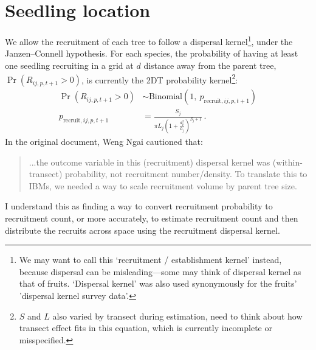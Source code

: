 \documentclass[12pt,a4paper]{article}
\begin{document}
\section{Seedling location}
We allow the recruitment of each tree to follow a dispersal kernel\footnote{We may want to call this `recruitment / establishment kernel' instead, because dispersal can be misleading---some may think of dispersal kernel as that of fruits. `Dispersal kernel' was also used synonymously for the fruits' 'dispersal kernel survey data'.}, under the Janzen--Connell hypothesis. For each species, the probability of having at least one seedling recruiting in a grid at $d$ distance away from the parent tree, $\Pr(R_{ij,p,t+1} > 0)$, is currently the 2DT probability kernel\footnote{$S$ and $L$ also varied by transect during estimation, need to think about how transect effect fits in this equation, which is currently incomplete or misspecified.}:
\begin{align}
\Pr(R_{ij,p,t+1} > 0) &\sim \text{Binomial}(1,~p_{\text{recruit},ij,p,t+1}) \\
p_{\text{recruit},ij,p,t+1} &= \frac{S_j}{\pi L_j (1 + \frac{d_p^2}{L_j})^{S_j+1}} \,.
\end{align}
In the original document, Weng Ngai cautioned that:
\begin{quote}
...the outcome variable in this (recruitment) dispersal kernel was (within-transect) probability, not recruitment number/density. To translate this to IBMs, we needed a way to scale recruitment volume by parent tree size.
\end{quote}
I understand this as finding a way to convert recruitment probability to recruitment count, or more accurately, to estimate recruitment count and then distribute the recruits across space using the recruitment dispersal kernel. 
\end{document}
